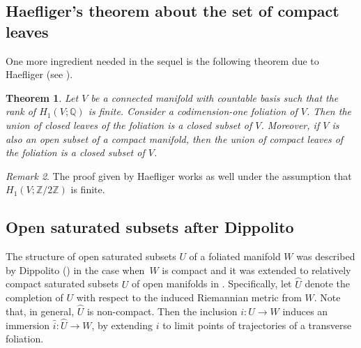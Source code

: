 \documentclass[10pt]{amsart}
\newtheorem{theorem}{Theorem}[section]
\theoremstyle{definition}
\theoremstyle{remark}
\newtheorem{remark}[theorem]{Remark}
\numberwithin{equation}{section}
\newcommand{\ZZ}{\mathbb Z}
\begin{document}
\subsection{Haefliger's theorem about the set of compact leaves}\label{sect:Haefliger}
One more ingredient needed in the sequel is the following theorem due to Haefliger (see \cite[Th.\,3.2, p.\,386]{Hae}).

\begin{theorem}\label{Haefliger}
Let $V$ be a connected manifold with countable basis such that the rank of $H_1(V;\mathbb Q)$ is finite. Consider a codimension-one
foliation of $V$. Then the union of closed leaves of the foliation is a closed subset of $V$.
Moreover, if $V$ is also an open subset of a compact manifold, then the union of compact leaves of the foliation is a closed subset of $V$.
\end{theorem}
\begin{remark}
The proof given by Haefliger works as well under the assumption that $H_1(V;\ZZ/2\ZZ)$ is finite.
\end{remark}

\subsection{Open saturated subsets after Dippolito}\label{Dippolito}
The structure of open saturated subsets $U$ of a foliated manifold $W$ was described by Dippolito (\cite{Dip})
in the case when~$W$ is compact and it was extended to relatively compact saturated subsets $U$ of open manifolds in
\cite{CaC}.
Specifically, let $\wideparen{U}$
denote the completion of $U$ with respect to the induced Riemannian metric from $W$. Note that,
in general, $\wideparen{U}$ is non-compact.
Then the inclusion $i:U\to W$ induces an immersion $\wideparen{i}:\wideparen{U}\to W$, by
extending $i$ to limit points of trajectories of a transverse foliation.
\end{document}

